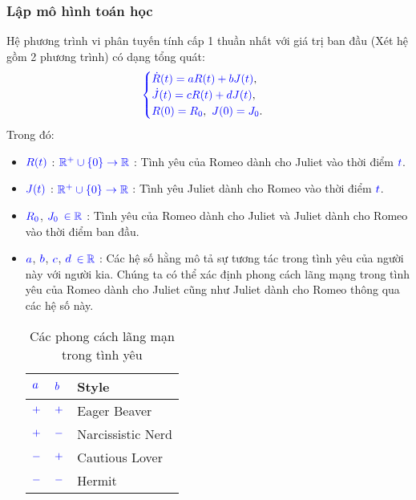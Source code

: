 \documentclass[a4paper]{article}
\begin{document}
	    \subsubsection{Lập mô hình toán học}
	Hệ phương trình vi phân tuyến tính cấp 1 thuần nhất với giá trị ban đầu (Xét hệ gồm 2 phương trình) có dạng tổng quát:
	\begin{align}
	    \textcolor{blue}{
	    \begin{cases}
            \dot R(t) = aR(t) + bJ(t) \textcolor{black}{,}\\
            \dot J(t) = cR(t) + dJ(t) \textcolor{black}{,}\\
            R(0) = R_{0}\textcolor{black}{,} \enskip J(0) = J_{0} \textcolor{black}{.}
        \end{cases}
        }
        \label{label3}
	\end{align}
    Trong đó:
    \begin{itemize}
        \item $\textcolor{blue}{R(t)}$ : $\textcolor{blue}{\mathbb{R}^{+} \cup \{0\} \to \mathbb{R}}$ : Tình yêu của Romeo dành cho Juliet vào thời điểm $\textcolor{blue}{t}$.
        \item $\textcolor{blue}{J(t)}$ : $\textcolor{blue}{\mathbb{R}^{+} \cup \{0\} \to \mathbb{R}}$ : Tình yêu Juliet dành cho Romeo vào thời điểm $\textcolor{blue}{t}$.
        \item $\textcolor{blue}{R_{0}}$, $\textcolor{blue}{J_{0}}$ $\textcolor{blue}{\in \mathbb{R}}$ : Tình yêu của Romeo dành cho Juliet và Juliet dành cho Romeo vào thời điểm ban đầu.
        \item $\textcolor{blue}{a}$, $\textcolor{blue}{b}$, $\textcolor{blue}{c}$, $\textcolor{blue}{d}$ $\textcolor{blue}{\in\mathbb{R}}$ : Các hệ số hằng mô tả sự tương tác trong tình yêu của người này với người kia. Chúng ta có thể xác định phong cách lãng mạng trong tình yêu của Romeo dành cho Juliet cũng như Juliet dành cho Romeo thông qua các hệ số này.\\
        \begin{table}[!htp]
        \centering
        \begin{tabular}{lll}
            \toprule
            $\textcolor{blue}{a}$ & $\textcolor{blue}{b}$  & {\bfseries Style}\\
            \midrule
            $\textcolor{blue}{+}$  & $\textcolor{blue}{+}$  & Eager Beaver\\
            $\textcolor{blue}{+}$  & $\textcolor{blue}{-}$  & Narcissistic Nerd\\
            $\textcolor{blue}{-}$  & $\textcolor{blue}{+}$  & Cautious Lover\\
            $\textcolor{blue}{-}$  & $\textcolor{blue}{-}$  & Hermit\\
            \bottomrule
        \end{tabular}
        \caption{Các phong cách lãng mạn trong tình yêu}
        \label{bang1}
        \end{table}
    \end{itemize}
\end{document}
